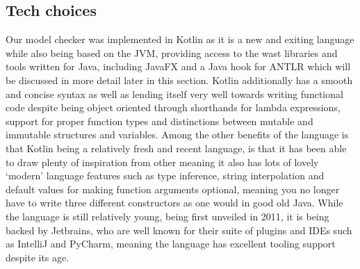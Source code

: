 \subsection{Tech choices}

Our model checker was implemented in Kotlin as it is a new and exiting language while also being based on the JVM, providing access to the wast libraries and tools written for Java, including JavaFX and a Java hook for ANTLR which will be discussed in more detail later in this section. Kotlin additionally has a smooth and concise syntax as well as lending itself very well towards writing functional code despite being object oriented through shorthands for lambda expressions, support for proper function types and distinctions between mutable and immutable structures and variables. Among the other benefits of the language is that Kotlin being a relatively fresh and recent language, is that it has been able to draw plenty of inspiration from other  meaning it also has lots of lovely `modern' language features such as type inference, string interpolation and default values for making function arguments optional, meaning you no longer have to write three different constructors as one would in good old Java. While the language is still relatively young, being first unveiled in 2011\cite{KotlinHello}, it is being backed by Jetbrains, who are well known for their suite of plugins and IDEs such as IntelliJ and PyCharm, meaning the language has excellent tooling support despite its age.

